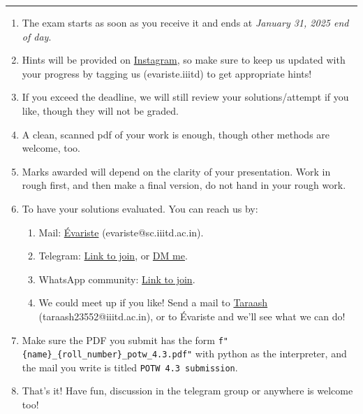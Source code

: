 \documentclass[12pt, letterpaper]{article}
\def\enddate{January 31, 2025}
\def\season{4}
\def\week{3}
\begin{document}
{\color{RubineRed} \rule{\linewidth}{0.5mm}}
\vspace{20pt}
\begin{enumerate} 
\item  The exam starts as soon as you receive it and ends at \emph{\enddate{} \emph{end of day}}.
\item Hints will be provided on \href{https://www.instagram.com/evariste.iiitd?utm_source=ig_web_button_share_sheet&igsh=ZDNlZDc0MzIxNw==}{Instagram}, so make sure to keep us updated with your progress by tagging us (evariste.iiitd) to get appropriate hints!
\item If you exceed the deadline, we will still review your solutions/attempt if you like, though they will not be graded.
\item A clean, scanned pdf of your work is enough, though other methods are welcome, too.
\item Marks awarded will depend on the clarity of your presentation. Work in rough first, and then make a final version, do not hand in your rough work. 
\item To have your solutions evaluated. You can reach us by:
    \begin{enumerate}
    \item Mail: \href{mailto:evariste@sc.iiitd.ac.in}{\color{Orchid}Évariste} (evariste@sc.iiitd.ac.in).
    \item Telegram: \href{https://t.me/joinchat/Da8m6kMPZmX7g93YWxlnKw}{Link to join}, or \href{https://t.me/TaraashMittal}{DM me}.
    \item WhatsApp community: \href{https://chat.whatsapp.com/Gw1a1ARhVMsEIDGdo0DjRw}{Link to join}.
    \item We could meet up if you like! Send a mail to \href{mailto:taraash23552@iiitd.ac.in}{\color{Orchid}Taraash} (taraash23552@iiitd.ac.in), or to Évariste and we'll see what we can do!
    \end{enumerate}
\item Make sure the PDF you submit has the form \colorbox{Dandelion}{\texttt{f"\{name\}\_\{roll\_number\}\_potw\_\season.\week.pdf"}} with python as the interpreter, and the mail you write is titled \colorbox{Dandelion}{\texttt{POTW \season.\week{} submission}}.
\item That's it! Have fun, discussion in the telegram group or anywhere is welcome too!
\end{enumerate}


\vspace{20pt}
\begin{center}
\end{center}
\end{document}
